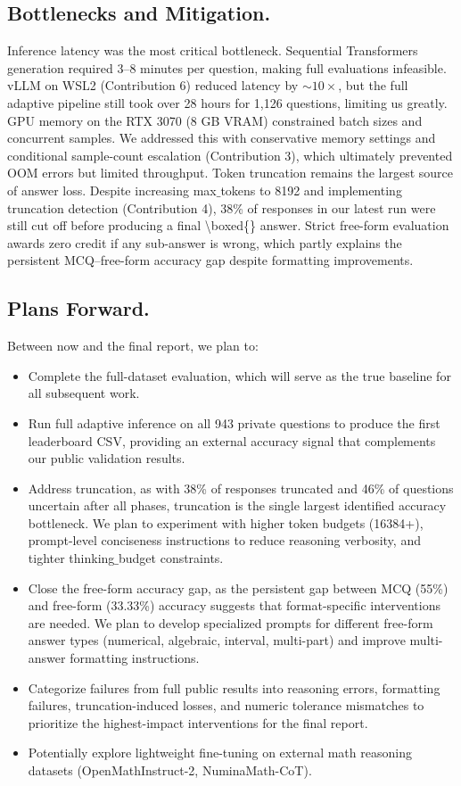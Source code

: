 \documentclass{article}
\begin{document}
\subsection{Bottlenecks and Mitigation.}
Inference latency was the most critical bottleneck. Sequential Transformers generation required 3–8 minutes per question, making full evaluations infeasible. vLLM on WSL2 (Contribution 6) reduced latency by $\sim10\times$, but the full adaptive pipeline still took over 28 hours for 1,126 questions, limiting us greatly. GPU memory on the RTX 3070 (8 GB VRAM) constrained batch sizes and concurrent samples. We addressed this with conservative memory settings and conditional sample-count escalation (Contribution 3), which ultimately prevented OOM errors but limited throughput. Token truncation remains the largest source of answer loss. Despite increasing max$\_$tokens to 8192 and implementing truncation detection (Contribution 4), 38\% of responses in our latest run were still cut off before producing a final \textbackslash boxed\{\} answer. Strict free-form evaluation awards zero credit if any sub-answer is wrong, which partly explains the persistent MCQ–free-form accuracy gap despite formatting improvements.

\subsection{Plans Forward.}
Between now and the final report, we plan to:
\begin{itemize}
    \item Complete the full-dataset evaluation, which will serve as the true baseline for all subsequent work.
    \item Run full adaptive inference on all 943 private questions to produce the first leaderboard CSV, providing an external accuracy signal that complements our public validation results.
    \item Address truncation, as with 38\% of responses truncated and 46\% of questions uncertain after all phases, truncation is the single largest identified accuracy bottleneck. We plan to experiment with higher token budgets (16384+), prompt-level conciseness instructions to reduce reasoning verbosity, and tighter thinking$\_$budget constraints.
    \item Close the free-form accuracy gap, as the persistent gap between MCQ (55\%) and free-form (33.33\%) accuracy suggests that format-specific interventions are needed. We plan to develop specialized prompts for different free-form answer types (numerical, algebraic, interval, multi-part) and improve multi-answer formatting instructions.
    \item Categorize failures from full public results into reasoning errors, formatting failures, truncation-induced losses, and numeric tolerance mismatches to prioritize the highest-impact interventions for the final report.
    \item Potentially explore lightweight fine-tuning on external math reasoning datasets (OpenMathInstruct-2, NuminaMath-CoT).
\end{itemize}
\end{document}
